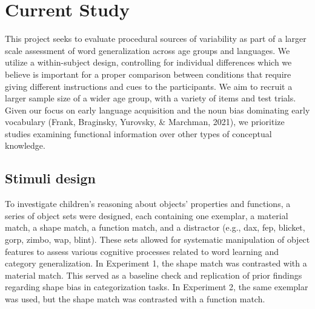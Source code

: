 \documentclass[10pt, letterpaper]{article}
\begin{document}
\hypertarget{current-study}{%
\section{Current Study}\label{current-study}}

This project seeks to evaluate procedural sources of variability as part
of a larger scale assessment of word generalization across age groups
and languages. We utilize a within-subject design, controlling for
individual differences which we believe is important for a proper
comparison between conditions that require giving different instructions
and cues to the participants. We aim to recruit a larger sample size of
a wider age group, with a variety of items and test trials. Given our
focus on early language acquisition and the noun bias dominating early
vocabulary (Frank, Braginsky, Yurovsky, \& Marchman, 2021), we
prioritize studies examining functional information over other types of
conceptual knowledge.

\hypertarget{stimuli-design}{%
\subsection{Stimuli design}\label{stimuli-design}}

To investigate children's reasoning about objects' properties and
functions, a series of object sets were designed, each containing one
exemplar, a material match, a shape match, a function match, and a
distractor (e.g., dax, fep, blicket, gorp, zimbo, wap, blint). These
sets allowed for systematic manipulation of object features to assess
various cognitive processes related to word learning and category
generalization. In Experiment 1, the shape match was contrasted with a
material match. This served as a baseline check and replication of prior
findings regarding shape bias in categorization tasks. In Experiment 2,
the same exemplar was used, but the shape match was contrasted with a
function match.
\end{document}
